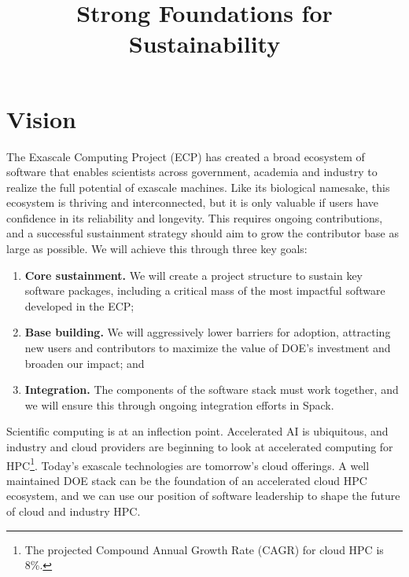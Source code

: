 \documentclass[11pt]{article}
\title{\vspace{-3em}\sf\huge\color{secblue}%
Strong Foundations for Sustainability}
\date{\vspace{-6em}}
\begin{document}
\setcounter{page}{1}

\maketitle

\section{Vision}

The Exascale Computing Project (ECP) has created a broad ecosystem of software that
enables scientists across government, academia and industry to realize the full
potential of exascale machines. Like its biological namesake, this ecosystem is thriving
and interconnected,
but it is only valuable if users have confidence in its reliability and longevity. This
requires ongoing contributions, and a successful sustainment strategy should aim to grow
the contributor base as large as possible. We will achieve this through three key goals:

\begin{enumerate}
\item {\bf Core sustainment.} We will create a project structure to sustain key
  software packages, including a critical mass of the most impactful software developed in the ECP;
\item {\bf Base building.} We will aggressively lower barriers for adoption, attracting new
    users and contributors to maximize the value of DOE's investment and broaden our
    impact; and
  \item {\bf Integration.} The components of the software stack must work together, and
    we will ensure this through ongoing integration efforts in Spack.
\end{enumerate}

Scientific computing is at an inflection point. Accelerated AI is ubiquitous, and
industry and cloud providers are beginning to look at accelerated computing for
HPC\footnote{The projected Compound Annual Growth Rate (CAGR) for cloud HPC is 8\%.}.
Today's exascale technologies are tomorrow's cloud offerings. A well maintained DOE
stack can be the foundation of an accelerated cloud HPC ecosystem, and we can use our
position of software leadership to shape the future of cloud and industry HPC.
\end{document}
